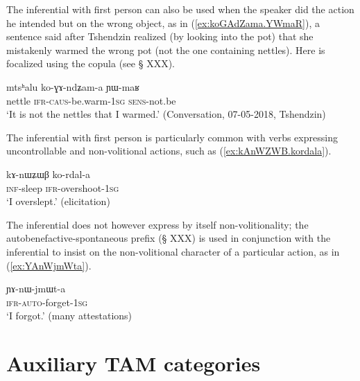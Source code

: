 
The inferential with first person can also be used when the speaker did the action he intended but on the wrong object, as in (\ref{ex:koGAdZama.YWmaR}), a sentence said after Tshendzin realized (by looking into the pot) that she mistakenly warmed the wrong pot (not the one containing nettles). Here  is focalized using the copula  (see § XXX).

\begin{exe}
\ex \label{ex:koGAdZama.YWmaR}
\gll  mtsʰalu ko-ɣɤ-ndʑam-a ɲɯ-maʁ \\
nettle \textsc{ifr}-\textsc{caus}-be.warm-\textsc{1sg} \textsc{sens}-not.be \\
\glt `It is not the nettles that I warmed.' (Conversation, 07-05-2018, Tshendzin)
\end{exe}

The inferential with first person is particularly common with verbs expressing uncontrollable and non-volitional actions, such as (\ref{ex:kAnWZWB.kordala}). 

\begin{exe}
\ex \label{ex:kAnWZWB.kordala}
\gll kɤ-nɯʑɯβ ko-rdal-a \\
\textsc{inf}-sleep \textsc{ifr}-overshoot-\textsc{1sg} \\
\glt `I overslept.' (elicitation)
\end{exe}

The inferential does not however express by itself non-volitionality; the autobenefactive-spontaneous prefix  (§ XXX) is used in conjunction with the inferential to insist on the non-volitional character of a particular action, as in (\ref{ex:YAnWjmWta}).

\begin{exe}
\ex \label{ex:YAnWjmWta}
\gll ɲɤ-nɯ-jmɯt-a \\
 \textsc{ifr}-\textsc{auto}-forget-\textsc{1sg} \\
\glt `I forgot.' (many attestations)
\end{exe}

  \section{Auxiliary TAM categories}
  
